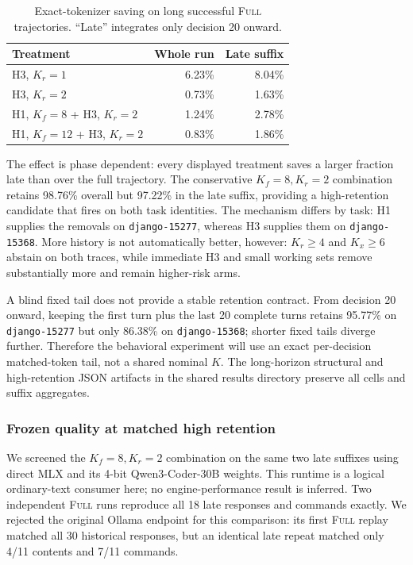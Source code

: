\documentclass[11pt]{article}
\begin{document}
\begin{table}[H]
\centering
\small
\caption{Exact-tokenizer saving on long successful \textsc{Full}
trajectories. ``Late'' integrates only decision 20 onward.}
\label{tab:long-horizon-opportunity}
\begin{tabular}{lrr}
\toprule
Treatment & Whole run & Late suffix \\
\midrule
H3, $K_r=1$ & 6.23\% & 8.04\% \\
H3, $K_r=2$ & 0.73\% & 1.63\% \\
H1, $K_f=8$ + H3, $K_r=2$ & 1.24\% & 2.78\% \\
H1, $K_f=12$ + H3, $K_r=2$ & 0.83\% & 1.86\% \\
\bottomrule
\end{tabular}
\end{table}

The effect is phase dependent: every displayed treatment saves a larger
fraction late than over the full trajectory.  The conservative
$K_f=8,K_r=2$ combination retains 98.76\% overall but 97.22\% in the late
suffix, providing a high-retention candidate that fires on both task
identities.  The mechanism differs by task: H1 supplies the removals on
\texttt{django-15277}, whereas H3 supplies them on
\texttt{django-15368}.  More history is not automatically better, however:
$K_r\geq4$ and $K_x\geq6$ abstain on both traces, while immediate H3 and small
working sets remove substantially more and remain higher-risk arms.

A blind fixed tail does not provide a stable retention contract.  From
decision 20 onward, keeping the first turn plus the last 20 complete turns
retains 95.77\% on \texttt{django-15277} but only 86.38\% on
\texttt{django-15368}; shorter fixed tails diverge further.  Therefore the
behavioral experiment will use an exact per-decision matched-token tail, not a
shared nominal $K$.  The long-horizon structural and high-retention JSON
artifacts in the shared results directory preserve all cells and suffix
aggregates.

\subsubsection{Frozen quality at matched high retention}

We screened the $K_f=8,K_r=2$ combination on the same two late suffixes using
direct MLX and its 4-bit Qwen3-Coder-30B weights.  This runtime is a logical
ordinary-text consumer here; no engine-performance result is inferred.  Two
independent \textsc{Full} runs reproduce all 18 late responses and commands
exactly.  We rejected the original Ollama endpoint for this comparison: its
first \textsc{Full} replay matched all 30 historical responses, but an
identical late repeat matched only 4/11 contents and 7/11 commands.
\end{document}
